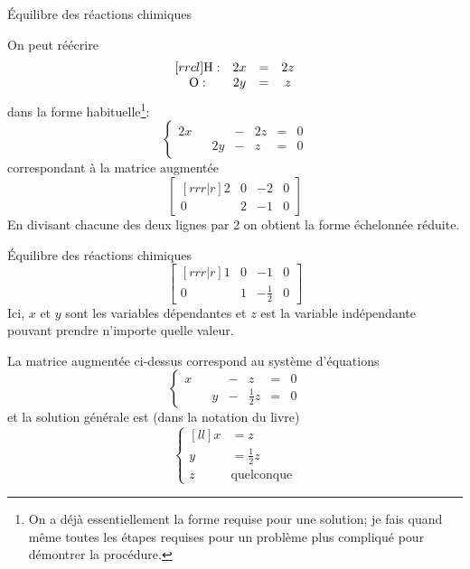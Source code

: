 \documentclass[french]{beamer}
\begin{document}
\begin{frame}{Équilibre des réactions chimiques}

On peut réécrire
\[
\begin{matrix}[rrcl]
\cf{H}: & 2x &=& 2z \\
\cf{O}: & 2y &=& z
\end{matrix}
\]
dans la forme habituelle\footnote{\color{red} On a déjà essentiellement
la forme requise pour une solution; je fais quand
même toutes les étapes requises pour un problème plus
compliqué pour démontrer la procédure.}:
\[
\left\{
\begin{matrix}
2x &&&-&2z&=& 0\\
&&2y&-&z&=&0
\end{matrix}
\right.
\]
correspondant à la matrice augmentée
\[
\begin{bmatrix}[rrr|r]
2 & 0 & -2 & 0 \\
0 & 2 & -1 & 0
\end{bmatrix}
\]
En divisant chacune des deux lignes par 2 on obtient la 
forme échelonnée réduite.
\end{frame}

\begin{frame}{Équilibre des réactions chimiques}
\[
\begin{bmatrix}[rrr|r]
1 & 0 & -1 & 0 \\
0 & 1 & -\frac12 & 0
\end{bmatrix}
\]
Ici, $x$ et $y$ sont les variables dépendantes et $z$ est la variable indépendante pouvant prendre n'importe quelle valeur.

La matrice augmentée ci-dessus correspond au système d'équations
\[
\left\{
\begin{matrix}
x &&&-&z&=& 0\\
&&y&-&\frac12 z&=&0
\end{matrix}
\right.
\]
et la solution générale est (dans la notation du livre)
\[
\left\{
\begin{matrix}[ll]
x & = z\\
y & = \frac12 z \\
z & \mbox{quelconque}
\end{matrix}
\right.
\]
\end{frame}
\end{document}
